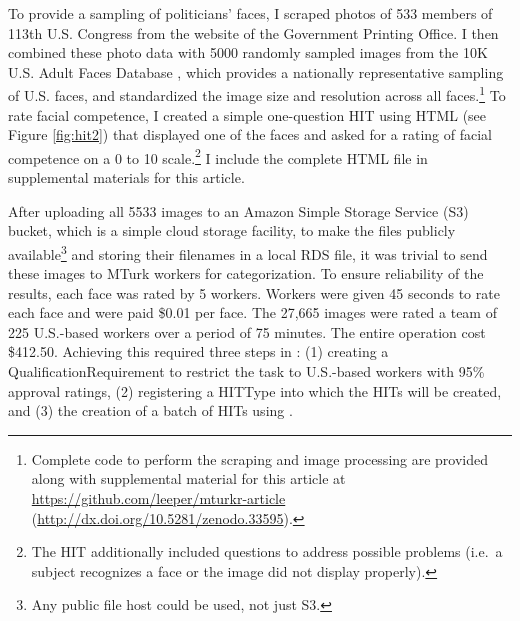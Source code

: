 To provide a sampling of politicians' faces, I scraped photos of 533 members of 113th U.S. Congress from the website of the Government Printing Office. I then combined these photo data with 5000 randomly sampled images from the 10K U.S. Adult Faces Database \citep{BainbridgeIsolaOliva2013}, which provides a nationally representative sampling of U.S. faces, and standardized the image size and resolution across all faces.\footnote{Complete code to perform the scraping and image processing are provided along with supplemental material for this article at \url{https://github.com/leeper/mturkr-article} (\url{http://dx.doi.org/10.5281/zenodo.33595}).} To rate facial competence, I created a simple one-question HIT using HTML (see Figure \ref{fig:hit2}) that displayed one of the faces and asked for a rating of facial competence on a 0 to 10 scale.\footnote{The HIT additionally included questions to address possible problems (i.e.\ a subject recognizes a face or the image did not display properly).} I include the complete HTML file in supplemental materials for this article.

After uploading all 5533 images to an Amazon Simple Storage Service (S3) bucket, which is a simple cloud storage facility, to make the files publicly available\footnote{Any public file host could be used, not just S3.} and storing their filenames in a local RDS file, it was trivial to send these images to MTurk workers for categorization. To ensure reliability of the results, each face was rated by 5 workers. Workers were given 45 seconds to rate each face and were paid \$0.01 per face. The 27,665 images were rated a team of 225 U.S.-based workers over a period of 75 minutes. The entire operation cost \$412.50. Achieving this required three steps in : (1) creating a QualificationRequirement to restrict the task to U.S.-based workers with 95\% approval ratings, (2) registering a HITType into which the HITs will be created, and (3) the creation of a batch of HITs using .

